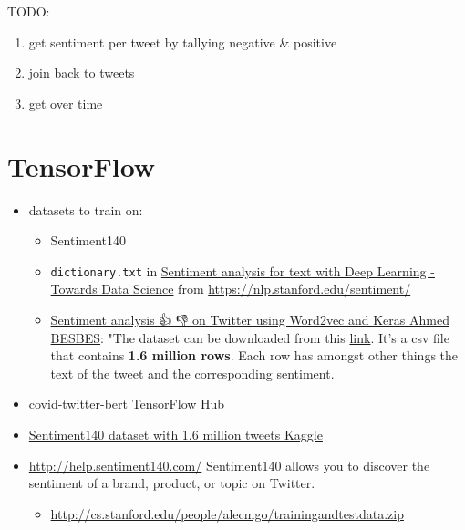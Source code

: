 \documentclass[]{book}
\providecommand{\tightlist}{%
  \setlength{\itemsep}{0pt}\setlength{\parskip}{0pt}}
\begin{document}
TODO:

\begin{enumerate}
\def\labelenumi{\arabic{enumi}.}
\tightlist
\item
  get sentiment per tweet by tallying negative \& positive
\item
  join back to tweets
\item
  get over time
\end{enumerate}

\hypertarget{tensorflow}{%
\section{TensorFlow}\label{tensorflow}}

\begin{itemize}
\item
  datasets to train on:

  \begin{itemize}
  \item
    Sentiment140
  \item
    \texttt{dictionary.txt} in \href{https://towardsdatascience.com/sentiment-analysis-for-text-with-deep-learning-2f0a0c6472b5}{Sentiment analysis for text with Deep Learning - Towards Data Science} from \url{https://nlp.stanford.edu/sentiment/}
  \item
    \href{https://www.ahmedbesbes.com/blog/sentiment-analysis-with-keras-and-word-2-vec}{Sentiment analysis 👍 👎 on Twitter using Word2vec and Keras \textbar{} Ahmed BESBES}:
    "The dataset can be downloaded from this \href{https://drive.google.com/uc?id=0B04GJPshIjmPRnZManQwWEdTZjg\&export=download}{link}. It's a csv file that contains \textbf{1.6 million rows}. Each row has amongst other things the text of the tweet and the corresponding sentiment.
  \end{itemize}
\item
  \href{https://tfhub.dev/digitalepidemiologylab/covid-twitter-bert/1}{covid-twitter-bert \textbar{} TensorFlow Hub}
\item
  \href{https://www.kaggle.com/kazanova/sentiment140}{Sentiment140 dataset with 1.6 million tweets \textbar{} Kaggle}
\item
  \url{http://help.sentiment140.com/}
  Sentiment140 allows you to discover the sentiment of a brand, product, or topic on Twitter.

  \begin{itemize}
  \tightlist
  \item
    \url{http://cs.stanford.edu/people/alecmgo/trainingandtestdata.zip}
  \end{itemize}
\end{itemize}
\end{document}
